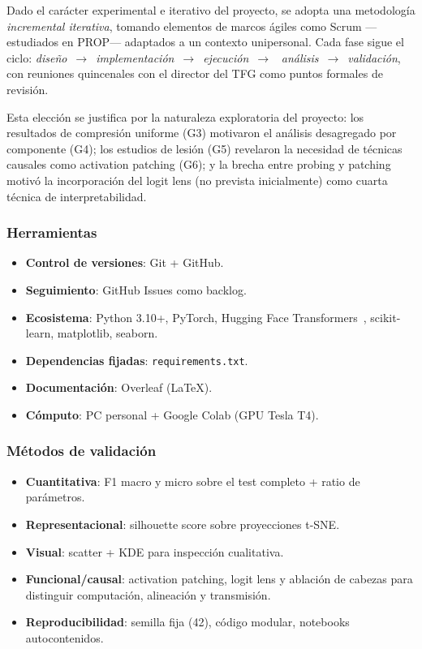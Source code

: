 Dado el carácter experimental e iterativo del proyecto, se adopta una
metodología \emph{incremental iterativa}, tomando elementos de marcos
ágiles como Scrum ---estudiados en PROP--- adaptados a un contexto
unipersonal. Cada fase sigue el ciclo:
\emph{diseño}~$\to$~\emph{implementación}~$\to$~\emph{ejecución}~$\to$~%
\emph{análisis}~$\to$~\emph{validación}, con reuniones quincenales con
el director del TFG como puntos formales de revisión.

Esta elección se justifica por la naturaleza exploratoria del proyecto:
los resultados de compresión uniforme (G3) motivaron el análisis
desagregado por componente (G4); los estudios de lesión (G5) revelaron
la necesidad de técnicas causales como activation patching (G6); y la
brecha entre probing y patching motivó la incorporación del logit lens
(no prevista inicialmente) como cuarta técnica de interpretabilidad.

\subsubsection{Herramientas}

\begin{itemize}[nosep]
    \item \textbf{Control de versiones}: Git + GitHub.
    \item \textbf{Seguimiento}: GitHub Issues como backlog.
    \item \textbf{Ecosistema}: Python 3.10+, PyTorch, Hugging Face
    Transformers~\cite{wolf2020transformers}, scikit-learn,
    matplotlib, seaborn.
    \item \textbf{Dependencias fijadas}: \texttt{requirements.txt}.
    \item \textbf{Documentación}: Overleaf (\LaTeX{}).
    \item \textbf{Cómputo}: PC personal + Google Colab (GPU Tesla T4).
\end{itemize}

\subsubsection{Métodos de validación}

\begin{itemize}[nosep]
    \item \textbf{Cuantitativa}: F1 macro y micro sobre el test
    completo + ratio de parámetros.
    \item \textbf{Representacional}: silhouette score sobre
    proyecciones t-SNE.
    \item \textbf{Visual}: scatter + KDE para inspección cualitativa.
    \item \textbf{Funcional/causal}: activation patching, logit lens
    y ablación de cabezas para distinguir computación, alineación y
    transmisión.
    \item \textbf{Reproducibilidad}: semilla fija (42), código modular,
    notebooks autocontenidos.
\end{itemize}



